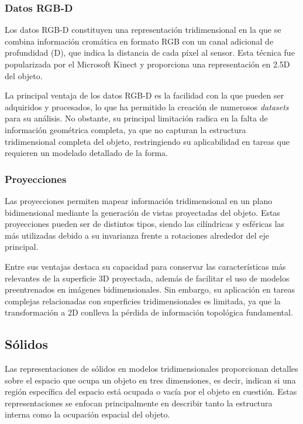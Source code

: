 \subsubsection{Datos RGB-D}
Los datos RGB-D constituyen una representación tridimensional en la que se combina información cromática en formato RGB con un canal adicional de profundidad (D), que indica la distancia de cada píxel al sensor. Esta técnica fue popularizada por el Microsoft Kinect y proporciona una representación en 2.5D del objeto.

La principal ventaja de los datos RGB-D es la facilidad con la que pueden ser adquiridos y procesados, lo que ha permitido la creación de numerosos \textit{datasets} para su análisis. No obstante, su principal limitación radica en la falta de información geométrica completa, ya que no capturan la estructura tridimensional completa del objeto, restringiendo su aplicabilidad en tareas que requieren un modelado detallado de la forma.

\subsubsection{Proyecciones}
Las proyecciones permiten mapear información tridimensional en un plano bidimensional mediante la generación de vistas proyectadas del objeto. Estas proyecciones pueden ser de distintos tipos, siendo las cilíndricas y esféricas las más utilizadas debido a su invarianza frente a rotaciones alrededor del eje principal.

Entre sus ventajas destaca su capacidad para conservar las características más relevantes de la superficie 3D proyectada, además de facilitar el uso de modelos preentrenados en imágenes bidimensionales. Sin embargo, su aplicación en tareas complejas relacionadas con superficies tridimensionales es limitada, ya que la transformación a 2D conlleva la pérdida de información topológica fundamental.

\subsection{Sólidos}
Las representaciones de sólidos en modelos tridimensionales proporcionan detalles sobre el espacio que ocupa un objeto en tres dimensiones, es decir, indican si una región específica del espacio está ocupada o vacía por el objeto en cuestión. Estas representaciones se enfocan principalmente en describir tanto la estructura interna como la ocupación espacial del objeto.

